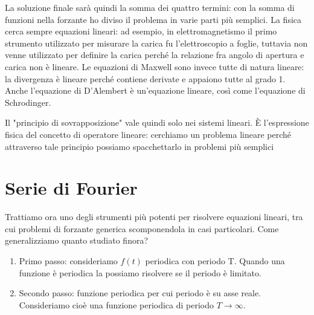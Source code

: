La soluzione finale sarà quindi la somma dei quattro termini: con la somma di funzioni nella forzante ho diviso il problema in varie parti più semplici. La fisica cerca sempre equazioni lineari: ad esempio, in elettromagnetismo il primo strumento utilizzato per misurare la carica fu l'elettroscopio a foglie, tuttavia non venne utilizzato per definire la carica perché la relazione fra angolo di apertura e carica non è lineare. Le equazioni di Maxwell sono invece tutte di natura lineare: la divergenza è lineare perché contiene derivate e appaiono tutte al grado 1. Anche l'equazione di D'Alembert è un'equazione lineare, così come l'equazione di Schrodinger.

Il "principio di sovrapposizione" vale quindi solo nei sistemi lineari. È l'espressione fisica del concetto di operatore lineare: cerchiamo un problema lineare perché attraverso tale principio possiamo spacchettarlo in problemi più semplici

\section{Serie di Fourier}

Trattiamo ora uno degli strumenti più potenti per risolvere equazioni lineari, tra cui problemi di forzante generica scomponendola in casi particolari. Come generalizziamo quanto studiato finora?
\begin{enumerate}
	
	\item Primo passo: consideriamo \(f(t)\) periodica con periodo T. Quando una funzione è periodica la possiamo risolvere se il periodo è limitato.
	\item Secondo passo: funzione periodica per cui periodo è su asse reale. Consideriamo cioè una funzione periodica di periodo \(T \to \infty \).  
\end{enumerate}

